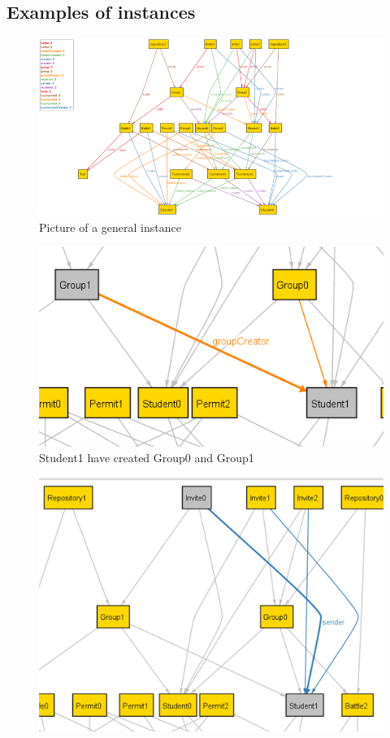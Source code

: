 \documentclass{article}
\begin{document}
{    \subsection{Examples of instances}
    \begin{figure}[H]
        \centering
        \hspace*{-3cm}\includegraphics[scale=1.5]{images/ALLOY/AlloyInstance1.png}
        \caption{Picture of a general instance}
        \label{fig:Picture of a general instance}
    \end{figure}
    \begin{figure}[H]
        \centering
        \includegraphics{images/ALLOY/groupCreator.png}
        \caption{Student1 have created Group0 and Group1}
        \label{fig:group creation}
    \end{figure}
    \begin{figure}[H]
        \centering
        \includegraphics{images/ALLOY/sender.png}

\end{figure}}
\end{document}
